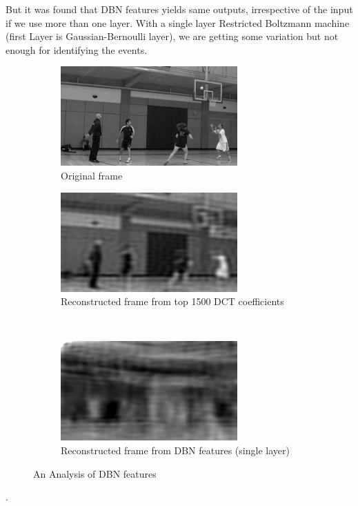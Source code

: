 But it was found that DBN features yields same outputs, irrespective of the input if we use more than one layer.  With a single layer Restricted Boltzmann machine (first Layer is Gaussian-Bernoulli layer), we are getting some variation but not enough for identifying the events.\\


\begin{figure}
        \centering
        \begin{subfigure}[b]{\textwidth}
        			\centering
                \includegraphics[scale=1]{./imgs/Original.png}
                \caption{Original frame}
                \label{fig:original}
        \end{subfigure}%
        
        \begin{subfigure}[b]{0.45\textwidth}
        		\centering
        		\includegraphics[scale=1]{./imgs/DCT.png}
        		\caption{Reconstructed frame from top 1500 DCT coefficients}
        		\label{fig:dct}
        \end{subfigure}
        ~%
        \begin{subfigure}[b]{0.45\textwidth}
        			\centering
                \includegraphics[scale=1]{./imgs/DBN.png}
                \caption{Reconstructed frame from DBN features (single layer)}
                \label{fig:dbn}
        \end{subfigure}
        \caption{ An Analysis of DBN features}
        \label{fig:dct+dbn}
\end{figure}.

